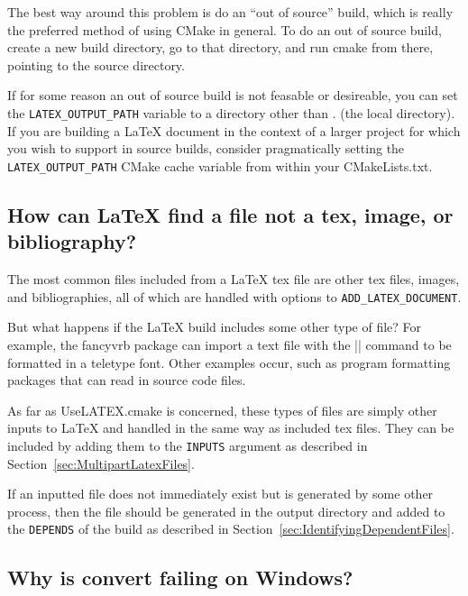 \documentclass{article}
\newcommand*{\textfile}[1]{\textsf{#1}}
\newcommand*{\textlatexpackage}[1]{\textsf{#1}}
\newcommand*{\textcmake}[1]{\texttt{#1}}
\newcommand*{\textcmakevar}[1]{\textcmake{#1}}
\newcommand*{\UseLATEX}{\textfile{UseLATEX.cmake}\xspace}
\newcommand*{\latex}{\LaTeX\xspace}
\newcommand*{\ald}{\textcmake{ADD\_LATEX\_DOCUMENT}\xspace}
\begin{document}
  The best way around this problem is do an ``out of source'' build, which
  is really the preferred method of using CMake in general.  To do an out
  of source build, create a new build directory, go to that directory, and
  run cmake from there, pointing to the source directory.

  If for some reason an out of source build is not feasable or desireable,
  you can set the \textcmakevar{LATEX\_OUTPUT\_PATH} variable to a
  directory other than \textfile{.} (the local directory).  If you are
  building a \latex document in the context of a larger project for which
  you wish to support in source builds, consider pragmatically setting the
  \textcmakevar{LATEX\_OUTPUT\_PATH} CMake cache variable from within your
  \textfile{CMakeLists.txt}.

  \subsection{How can \latex find a file not a tex, image, or bibliography?}
  \label{sec:How_can_latex_find_a_file_not_a_tex_image_or_bibliography}

  The most common files included from a \latex tex file are other tex
  files, images, and bibliographies, all of which are handled with options
  to \ald.

  But what happens if the \latex build includes some other type of file?
  For example, the \textlatexpackage{fancyvrb} package can import a text
  file with the \textlatex|\VerbatimInput| command to be formatted in a
  teletype font.  Other examples occur, such as program formatting packages
  that can read in source code files.

  As far as \UseLATEX is concerned, these types of files are simply other
  inputs to \latex and handled in the same way as included tex files.  They
  can be included by adding them to the \textcmake{INPUTS} argument as
  described in Section~\ref{sec:MultipartLatexFiles}.

  If an inputted file does not immediately exist but is generated by some
  other process, then the file should be generated in the output directory
  and added to the \textcmake{DEPENDS} of the build as described in
  Section~\ref{sec:IdentifyingDependentFiles}.

  \subsection{Why is convert failing on Windows?}
  \label{sec:Why_is_convert_failing_on_Windows}
\end{document}

